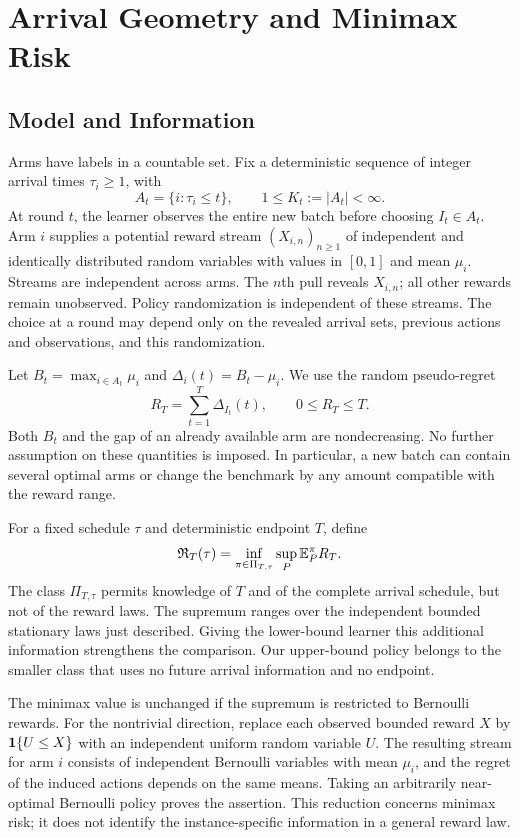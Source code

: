 \section{Arrival Geometry and Minimax Risk}\label{sec:geometry}
\subsection{Model and Information}
Arms have labels in a countable set. Fix a deterministic sequence of integer arrival times $\tau_i\ge1$, with
\[
 A_t=\{i:\tau_i\le t\},\qquad 1\le K_t:=|A_t|<\infty.
\]
At round $t$, the learner observes the entire new batch before choosing $I_t\in A_t$. Arm $i$ supplies a potential reward stream $(X_{i,n})_{n\ge1}$ of independent and identically distributed random variables with values in $[0,1]$ and mean $\mu_i$. Streams are independent across arms. The $n$th pull reveals $X_{i,n}$; all other rewards remain unobserved. Policy randomization is independent of these streams. The choice at a round may depend only on the revealed arrival sets, previous actions and observations, and this randomization.

Let $B_t=\max_{i\in A_t}\mu_i$ and $\Delta_i(t)=B_t-\mu_i$. We use the random pseudo-regret
\begin{equation}\label{eq:regret}
 R_T=\sum_{t=1}^T\Delta_{I_t}(t),\qquad 0\le R_T\le T.
\end{equation}
Both $B_t$ and the gap of an already available arm are nondecreasing. No further assumption on these quantities is imposed. In particular, a new batch can contain several optimal arms or change the benchmark by any amount compatible with the reward range.

For a fixed schedule $\tau$ and deterministic endpoint $T$, define
\begin{equation}\label{eq:minimax}
 \mathfrak R_T(\tau)=\inf_{\pi\in\Pi_{T,\tau}}\sup_P\mathbb E_P^\pi R_T.
\end{equation}
The class $\Pi_{T,\tau}$ permits knowledge of $T$ and of the complete arrival schedule, but not of the reward laws. The supremum ranges over the independent bounded stationary laws just described. Giving the lower-bound learner this additional information strengthens the comparison. Our upper-bound policy belongs to the smaller class that uses no future arrival information and no endpoint.

The minimax value is unchanged if the supremum is restricted to Bernoulli rewards. For the nontrivial direction, replace each observed bounded reward $X$ by $\mathbf 1\{U\le X\}$ with an independent uniform random variable $U$. The resulting stream for arm $i$ consists of independent Bernoulli variables with mean $\mu_i$, and the regret of the induced actions depends on the same means. Taking an arbitrarily near-optimal Bernoulli policy proves the assertion. This reduction concerns minimax risk; it does not identify the instance-specific information in a general reward law.

